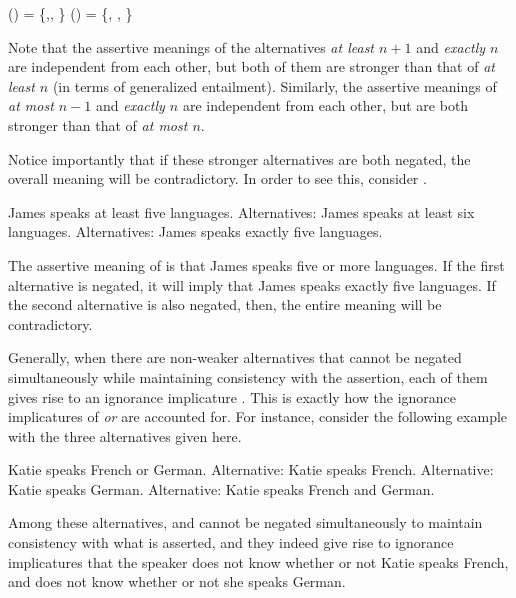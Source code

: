 \documentclass[output=paper]{langscibook}
\begin{document}
    \ea  \label{don-sud:alts}
        \ea {}() = \{,, \}
        \ex {}() = \{, , \}
        \z
    \z
    
\noindent Note that the assertive meanings of the alternatives \textit{at least $n+1$} and \textit{exactly $n$} are independent from each other, but both of them are stronger than that of \textit{at least $n$} (in terms of generalized entailment). Similarly, the assertive meanings of \textit{at most $n-1$} and \textit{exactly $n$} are independent from each other, but are both stronger than that of \textit{at most $n$}.

Notice importantly that if these stronger alternatives are both negated, the overall meaning will be contradictory. In order to see this, consider .

    \ea James speaks at least five languages. \label{don-sud:ii-ex}
        \ea Alternatives: James speaks at least six languages.
        \ex Alternatives: James speaks exactly five languages.
        \z
    \z

\noindent The assertive meaning of  is that James speaks five or more languages. If the first alternative is negated, it will imply that James speaks exactly five languages. If the second alternative is also negated, then, the entire meaning will be contradictory.

Generally, when there are non-weaker alternatives that cannot be negated simultaneously while maintaining consistency with the assertion, each of them gives rise to an ignorance implicature \citep{sauerland, fox, mayr, meyer, schwarz}. This is exactly how the ignorance implicatures of \textit{or} are accounted for. For instance, consider the following example with the three alternatives given here.

    \ea Katie speaks French or German.\label{don-sud:or}
        \ea Alternative: Katie speaks French.\label{don-sud:fr}
        \ex Alternative: Katie speaks German.\label{don-sud:gr}
        \ex Alternative: Katie speaks French and German.\label{don-sud:frandgr}
        \z
    \z

\noindent Among these alternatives,  and  cannot be negated simultaneously to maintain consistency with what is asserted, and they indeed give rise to ignorance implicatures that the speaker does not know whether or not Katie speaks French, and does not know whether or not she speaks German.
\end{document}
